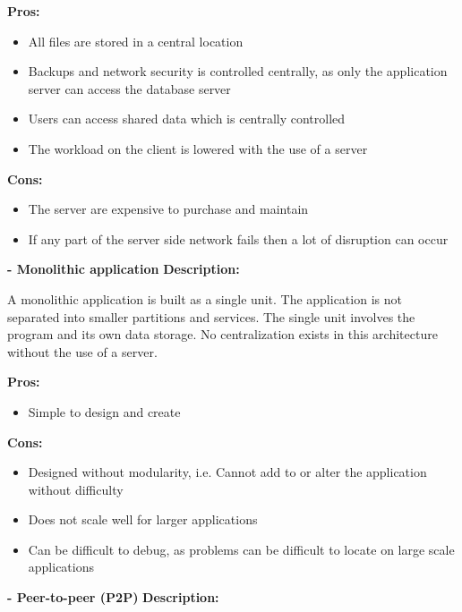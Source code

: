 \documentclass{article}
\begin{document}
\begin{enumerate}
		\textbf{Pros:}
		\begin{itemize}
			\item All files are stored in a central location
			\item Backups and network security is controlled centrally, as only the application server can access the database server
			\item Users can access shared data which is centrally controlled
			\item The workload on the client is lowered with the use of a server				
		\end{itemize}
		
		\textbf{Cons:}
		\begin{itemize}
			\item The server are expensive to purchase and maintain
			\item If any part of the server side network fails then a lot of disruption can occur				
		\end{itemize}
		
		
		
		
		\textbf{- Monolithic application}
		\newline\newline
		\textbf{Description:}
		
		\begin{flushleft}
			A monolithic application is built as a single unit. The application is not separated into smaller partitions and services.
			The single unit involves the program and its own data storage. No centralization exists in this architecture without the use of a server.				
		\end{flushleft}
		
		\textbf{Pros:}
		\begin{itemize}
			\item Simple to design and create
		\end{itemize}
		
		\textbf{Cons:}
		\begin{itemize}
			\item Designed without modularity, i.e. Cannot add to or alter the application without difficulty
			\item Does not scale well for larger applications
			\item Can be difficult to debug, as problems can be difficult to locate on large scale applications
		\end{itemize}
		
		
		
		
		\textbf{- Peer-to-peer (P2P)}
		\newline\newline
		\textbf{Description:}
		

\end{enumerate}
\end{document}
